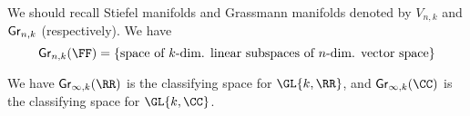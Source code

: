 We should recall Stiefel manifolds and Grassmann manifolds
denoted by $V_{n,k}$ and $\mathop{\mathsf{Gr}}\nolimits_{n,k}$ (respectively). We have
\begin{equation}
\Gr_{n,k}(\FF)=\{\text{space of $k$-dim. linear subspaces of
$n$-dim. vector space}\}
\end{equation}
\begin{thm}
We have $\Gr_{\infty,k}(\RR)$ is the classifying
space for
$\GL{k,\RR}$, and $\Gr_{\infty,k}(\CC)$ is the classifying space
for $\GL{k,\CC}$.
\end{thm}


